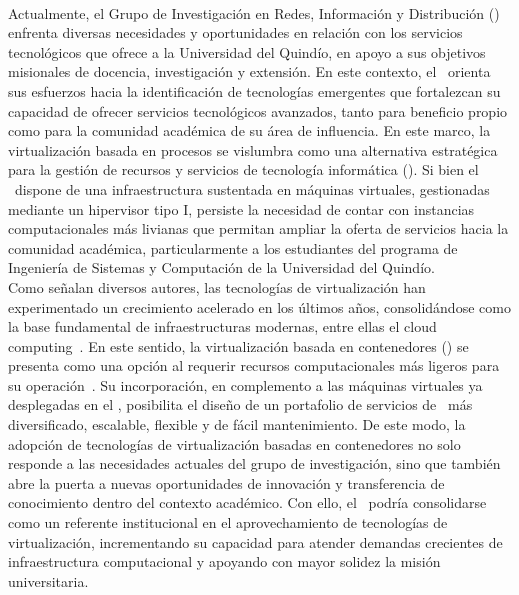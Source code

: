 \label{cap:justificacion}
\mbox{}\\
Actualmente, el Grupo de Investigación en Redes, Información y Distribución 
(\GRID) enfrenta diversas necesidades y oportunidades en relación con los servicios 
tecnológicos que ofrece a la Universidad del Quindío, en apoyo a sus objetivos 
misionales de docencia, investigación y extensión. En este contexto, el \GRID\ 
orienta sus esfuerzos hacia la identificación de tecnologías emergentes que fortalezcan 
su capacidad de ofrecer servicios tecnológicos avanzados, tanto para beneficio propio 
como para la comunidad académica de su área de influencia. En este marco, la virtualización basada en procesos se vislumbra como una alternativa 
estratégica para la gestión de recursos y servicios de tecnología informática 
(\TI). Si bien el \GRID\ dispone de una infraestructura sustentada en máquinas virtuales, 
gestionadas mediante un hipervisor tipo I, persiste la necesidad de contar con instancias 
computacionales más livianas que permitan ampliar la oferta de servicios hacia la comunidad 
académica, particularmente a los estudiantes del programa de Ingeniería de Sistemas y 
Computación de la Universidad del Quindío.\\
Como señalan diversos autores, las tecnologías de virtualización han experimentado un 
crecimiento acelerado en los últimos años, consolidándose como la base fundamental de 
infraestructuras modernas, entre ellas el cloud computing~\citep{Sepulveda-Rodriguez2022}. 
En este sentido, la virtualización basada en contenedores (\VBC) se presenta como una opción 
al requerir recursos computacionales más ligeros para su operación~\citep{Xavier2013}. 
Su incorporación, en complemento a las máquinas virtuales ya desplegadas en el \GRID, 
posibilita el diseño de un portafolio de servicios de \TI\ más diversificado, escalable, 
flexible y de fácil mantenimiento. De este modo, la adopción de tecnologías de virtualización basadas en contenedores no solo 
responde a las necesidades actuales del grupo de investigación, sino que también abre la 
puerta a nuevas oportunidades de innovación y transferencia de conocimiento dentro del 
contexto académico. Con ello, el \GRID\ podría consolidarse como un referente institucional 
en el aprovechamiento de tecnologías de virtualización, incrementando su capacidad para 
atender demandas crecientes de infraestructura computacional y apoyando con mayor solidez 
la misión universitaria.